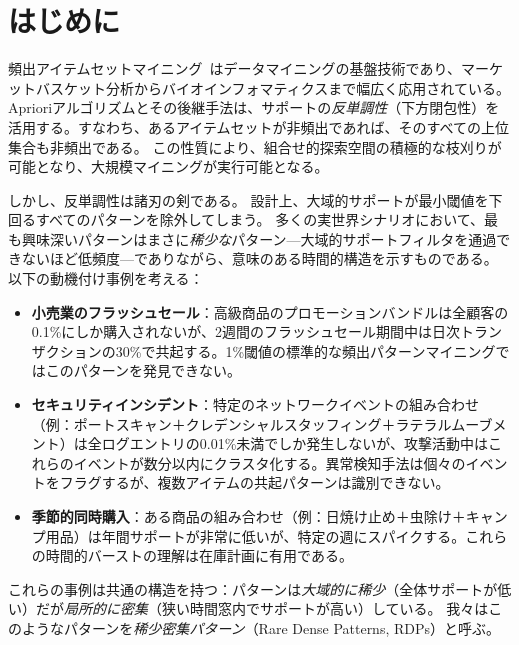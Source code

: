 \section{はじめに}\label{sec:intro}

頻出アイテムセットマイニング~\cite{agrawal1994apriori}はデータマイニングの基盤技術であり、マーケットバスケット分析からバイオインフォマティクスまで幅広く応用されている。
Aprioriアルゴリズムとその後継手法は、サポートの\emph{反単調性}（下方閉包性）を活用する。すなわち、あるアイテムセットが非頻出であれば、そのすべての上位集合も非頻出である。
この性質により、組合せ的探索空間の積極的な枝刈りが可能となり、大規模マイニングが実行可能となる。

しかし、反単調性は諸刃の剣である。
設計上、大域的サポートが最小閾値を下回るすべてのパターンを除外してしまう。
多くの実世界シナリオにおいて、最も興味深いパターンはまさに\emph{稀少な}パターン---大域的サポートフィルタを通過できないほど低頻度---でありながら、意味のある時間的構造を示すものである。
以下の動機付け事例を考える：

\begin{itemize}
\item \textbf{小売業のフラッシュセール}：高級商品のプロモーションバンドルは全顧客の0.1\%にしか購入されないが、2週間のフラッシュセール期間中は日次トランザクションの30\%で共起する。1\%閾値の標準的な頻出パターンマイニングではこのパターンを発見できない。

\item \textbf{セキュリティインシデント}：特定のネットワークイベントの組み合わせ（例：ポートスキャン＋クレデンシャルスタッフィング＋ラテラルムーブメント）は全ログエントリの0.01\%未満でしか発生しないが、攻撃活動中はこれらのイベントが数分以内にクラスタ化する。異常検知手法は個々のイベントをフラグするが、複数アイテムの共起パターンは識別できない。

\item \textbf{季節的同時購入}：ある商品の組み合わせ（例：日焼け止め＋虫除け＋キャンプ用品）は年間サポートが非常に低いが、特定の週にスパイクする。これらの時間的バーストの理解は在庫計画に有用である。
\end{itemize}

これらの事例は共通の構造を持つ：パターンは\emph{大域的に稀少}（全体サポートが低い）だが\emph{局所的に密集}（狭い時間窓内でサポートが高い）している。
我々はこのようなパターンを\emph{稀少密集パターン}（Rare Dense Patterns, RDPs）と呼ぶ。

